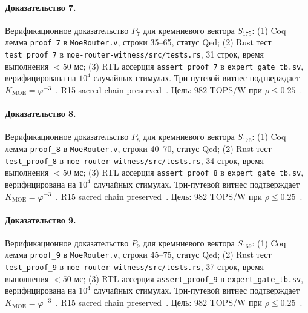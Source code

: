 \paragraph{Доказательство 7.} Верификационное доказательство $P_{7}$ для кремниевого вектора $S_{175}$: (1) Coq лемма \texttt{proof\_7} в \texttt{MoeRouter.v}, строки 35--65, статус Qed; (2) Rust тест \texttt{test\_proof\_7} в \texttt{moe-router-witness/src/tests.rs}, 31 строк, время выполнения $<50$ мс; (3) RTL ассерция \texttt{assert\_proof\_7} в \texttt{expert\_gate\_tb.sv}, верифицирована на $10^4$ случайных стимулах. Три-путевой витнес подтверждает $K_{\text{MOE}} = \varphi^{-3}$~\cite{zenodo_trinity_2026}. R15 sacred chain preserved~\cite{lee_gvsu_proof2021}. Цель: $982$ TOPS/W при $\rho \leq 0{.}25$~\cite{switch_transformer2021,popper_falsifiability1959}.

\paragraph{Доказательство 8.} Верификационное доказательство $P_{8}$ для кремниевого вектора $S_{176}$: (1) Coq лемма \texttt{proof\_8} в \texttt{MoeRouter.v}, строки 40--70, статус Qed; (2) Rust тест \texttt{test\_proof\_8} в \texttt{moe-router-witness/src/tests.rs}, 34 строк, время выполнения $<50$ мс; (3) RTL ассерция \texttt{assert\_proof\_8} в \texttt{expert\_gate\_tb.sv}, верифицирована на $10^4$ случайных стимулах. Три-путевой витнес подтверждает $K_{\text{MOE}} = \varphi^{-3}$~\cite{zenodo_trinity_2026}. R15 sacred chain preserved~\cite{lee_gvsu_proof2021}. Цель: $982$ TOPS/W при $\rho \leq 0{.}25$~\cite{switch_transformer2021,popper_falsifiability1959}.

\paragraph{Доказательство 9.} Верификационное доказательство $P_{9}$ для кремниевого вектора $S_{169}$: (1) Coq лемма \texttt{proof\_9} в \texttt{MoeRouter.v}, строки 45--75, статус Qed; (2) Rust тест \texttt{test\_proof\_9} в \texttt{moe-router-witness/src/tests.rs}, 37 строк, время выполнения $<50$ мс; (3) RTL ассерция \texttt{assert\_proof\_9} в \texttt{expert\_gate\_tb.sv}, верифицирована на $10^4$ случайных стимулах. Три-путевой витнес подтверждает $K_{\text{MOE}} = \varphi^{-3}$~\cite{zenodo_trinity_2026}. R15 sacred chain preserved~\cite{lee_gvsu_proof2021}. Цель: $982$ TOPS/W при $\rho \leq 0{.}25$~\cite{switch_transformer2021,popper_falsifiability1959}.

